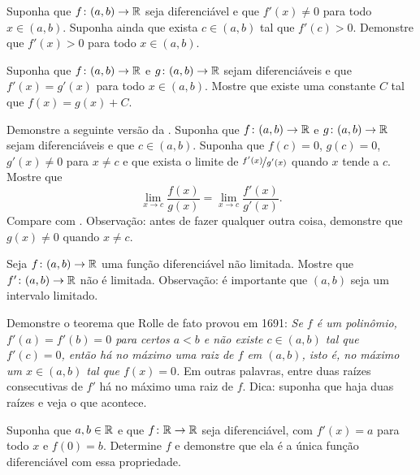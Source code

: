 \begin{exercise}
Suponha que $f \colon (a,b) \to {\mathbb{R}}$ seja diferenciável e que $f'(x) \neq 0$ para todo $x \in (a,b)$. Suponha ainda que exista $c \in (a,b)$ tal que $f'(c)>0$. Demonstre que $f'(x)>0$ para todo $x \in (a,b)$.
\end{exercise}

\begin{exercise} \label{exercise:samediffconst}
Suponha que $f \colon (a,b) \to {\mathbb{R}}$ e $g \colon (a,b) \to {\mathbb{R}}$ sejam diferenciáveis e que $f'(x)=g'(x)$ para todo $x \in (a,b)$. Mostre que existe uma constante $C$ tal que $f(x)=g(x)+C$.
\end{exercise}

\begin{exercise}
Demonstre a seguinte versão da .
Suponha que $f \colon (a,b) \to {\mathbb{R}}$ e $g \colon (a,b) \to {\mathbb{R}}$ sejam diferenciáveis e que $c \in (a,b)$. Suponha que $f(c)=0$, $g(c)=0$, $g'(x) \neq 0$ para $x \neq c$ e que exista o limite de $\nicefrac{f'(x)}{g'(x)}$ quando $x$ tende a $c$. Mostre que
\begin{equation*}
\lim_{x \to c} \frac{f(x)}{g(x)} = 
\lim_{x \to c} \frac{f'(x)}{g'(x)} .
\end{equation*}
Compare com .
Observação: antes de fazer qualquer outra coisa, demonstre que $g(x) \neq 0$ quando $x \neq c$.
\end{exercise}

\begin{exercise}
Seja $f \colon (a,b) \to {\mathbb{R}}$ uma função diferenciável não limitada. Mostre que $f' \colon (a,b) \to {\mathbb{R}}$ não é limitada.
Observação: é importante que $(a,b)$ seja um intervalo limitado.
\end{exercise}

\begin{exercise}
Demonstre o teorema que Rolle de fato provou em 1691:
\emph{Se $f$ é um polinômio, $f'(a)=f'(b)=0$ para certos $a<b$ e não existe $c \in (a,b)$ tal que $f'(c)=0$, então há no máximo uma raiz de $f$ em $(a,b)$, isto é, no máximo um $x \in (a,b)$ tal que $f(x)=0$.}
Em outras palavras, entre duas raízes consecutivas de $f'$ há no máximo uma raiz de $f$.
Dica: suponha que haja duas raízes e veja o que acontece.
\end{exercise}

\begin{exercise}
Suponha que $a,b \in {\mathbb{R}}$ e que $f \colon {\mathbb{R}} \to {\mathbb{R}}$ seja diferenciável, com $f'(x)=a$ para todo $x$ e $f(0)=b$. Determine $f$ e demonstre que ela é a única função diferenciável com essa propriedade.
\end{exercise}

